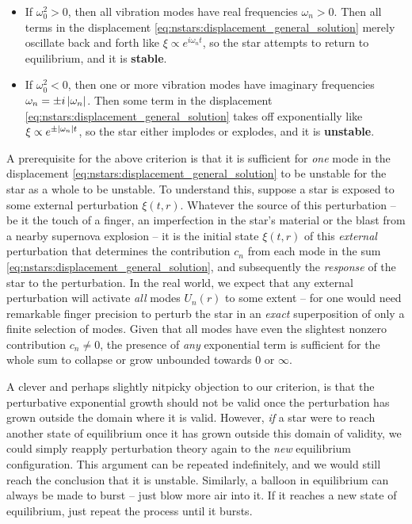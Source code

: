 \begin{itemize}
\item If $\omega_0^2 > 0$, then all vibration modes have real frequencies $\omega_n > 0$.
      Then all terms in the displacement \eqref{eq:nstars:displacement_general_solution} merely oscillate back and forth like $\xi \propto e^{i \omega_n t}$, so the star attempts to return to equilibrium, and it is \textbf{stable}.
\item If $\omega_0^2 < 0$, then one or more vibration modes have imaginary frequencies $\omega_n = \pm i \left\lvert \omega_n \right\rvert$.
      Then some term in the displacement \eqref{eq:nstars:displacement_general_solution} takes off exponentially like $\xi \propto e^{\pm \left\lvert \omega_n \right\rvert t}$, so the star either implodes or explodes, and it is \textbf{unstable}.
\end{itemize}
A prerequisite for the above criterion is that it is sufficient for \emph{one} mode in the displacement \eqref{eq:nstars:displacement_general_solution} to be unstable for the star as a whole to be unstable.
To understand this, suppose a star is exposed to some external perturbation $\xi(t,r)$.
Whatever the source of this perturbation -- be it the touch of a finger, an imperfection in the star's material or the blast from a nearby supernova explosion -- it is the initial state $\xi(t,r)$ of this \emph{external} perturbation that determines the contribution $c_n$ from each mode in the sum \eqref{eq:nstars:displacement_general_solution}, and subsequently the \emph{response} of the star to the perturbation.
In the real world, we expect that any external perturbation will activate \emph{all} modes $U_n(r)$ to some extent -- for one would need remarkable finger precision to perturb the star in an \emph{exact} superposition of only a finite selection of modes.
Given that all modes have even the slightest nonzero contribution $c_n \neq 0$, the presence of \emph{any} exponential term is sufficient for the whole sum to collapse or grow unbounded towards $0$ or $\infty$.

A clever and perhaps slightly nitpicky objection to our criterion, is that the perturbative exponential growth should not be valid once the perturbation has grown outside the domain where it is valid.
However, \emph{if} a star were to reach another state of equilibrium once it has grown outside this domain of validity, we could simply reapply perturbation theory again to the \emph{new} equilibrium configuration.
This argument can be repeated indefinitely, and we would still reach the conclusion that it is unstable.
Similarly, a balloon in equilibrium can always be made to burst -- just blow more air into it.
If it reaches a new state of equilibrium, just repeat the process until it bursts.

